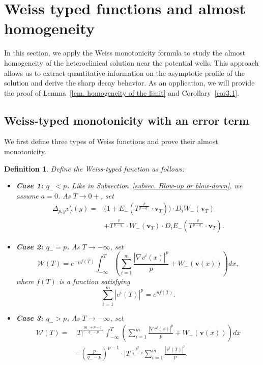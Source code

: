 \documentclass[11pt,twoside,reqno]{amsart}
\newcounter{assu}
\newtheorem{definition}{Definition}[section]
\numberwithin{equation}{section}
\begin{document}
\section{Weiss typed functions and almost homogeneity}
In this section, we apply the Weiss monotonicity formula \cite{W99} to study the almost homogeneity of the heteroclinical solution near the potential wells. This approach allows us to extract quantitative information on the asymptotic profile of the solution and derive the sharp decay behavior. As an application, we will provide the proof of Lemma~\ref{lem. homogeneity of the limit} and Corollary~\ref{cor3.1}.
\subsection{Weiss-typed monotonicity with an error term} We first define three types of Weiss functions and prove their almost monotonicity.
\begin{definition}\label{def. Weiss original definition}
Define the Weiss-typed function as follows:
\begin{itemize}
    \item \textbf{Case 1: $q_{-}<p$.} Like in Subsection~\ref{subsec. Blow-up or blow-down}, we assume $a=0$. As $T\to0+$, set
    \begin{align*}
        \Delta_{p,y}v^{i}_{T}(y)=&\Big(1+E_{-}(T^{\frac{p}{p-q_{-}}}\cdot\mathbf{v}_{T})\Big)\cdot D_{i}W_{-}(\mathbf{v}_{T})\\
        &+T^{\frac{p}{p-q_{-}}}\cdot W_{-}(\mathbf{v}_{T})\cdot D_{i}E_{-}(T^{\frac{p}{p-q_{-}}}\cdot\mathbf{v}_{T}).
    \end{align*}
    \item \textbf{Case 2: $q_{-}=p$.} As $T\to-\infty$, set
    \begin{equation*}
        \mathcal{W}(T)=e^{-pf(T)} \int_{-\infty}^T \left(\sum_{i=1}^m \frac{|\nabla v^i(x)|^p}{p}+W_{-}(\mathbf{v}(x))\right)dx,
    \end{equation*}
    where $f(T)$ is a function satisfying
    \begin{equation}\label{fS}
        \sum_{i=1}^m |v^i(T)|^p=e^{pf(T)}.
    \end{equation}
    \item \textbf{Case 3: $q_{-}>p$.} As $T\to-\infty$, set 
       \begin{align*}
        \mathcal{W}(T)=&|T|^{\frac{pq_{-}+p-q_{-}}{q_{-}-p}}\int_{-\infty}^{T} \left(\sum_{i=1}^m \frac{|\nabla v^i(x)|^p}{p}+W_{-}(\mathbf{v}(x)) \right) dx\\
        &-\left(\frac{p}{q_{-}-p}\right)^{p-1}\cdot |T|^{\frac{p^2}{q_{-}-p}} \sum_{i=1}^{m}\frac{|v^i(T)|^p}{p}.
    \end{align*}
\end{itemize}
\end{definition}
\end{document}
